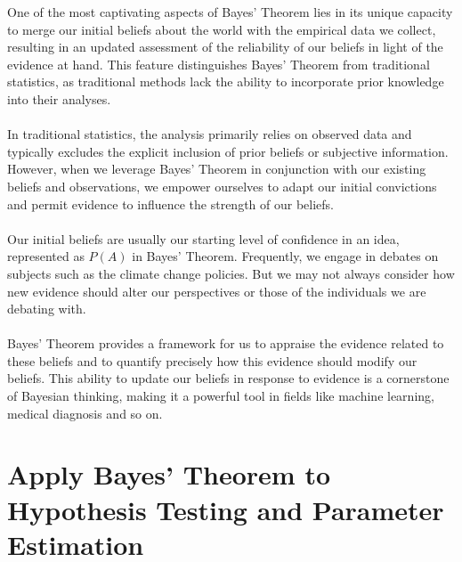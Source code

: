 \documentclass{article}
\begin{document}
One of the most captivating aspects of Bayes' Theorem lies in its unique capacity to merge our initial beliefs about the world with the empirical data we collect, resulting in an updated assessment of the reliability of our beliefs in light of the evidence at hand. This feature distinguishes Bayes' Theorem from traditional statistics, as traditional methods lack the ability to incorporate prior knowledge into their analyses.\\\\
In traditional statistics, the analysis primarily relies on observed data and typically excludes the explicit inclusion of prior beliefs or subjective information. However, when we leverage Bayes' Theorem in conjunction with our existing beliefs and observations, we empower ourselves to adapt our initial convictions and permit evidence to influence the strength of our beliefs.\\\\
Our initial beliefs are usually our starting level of confidence in an idea, represented as \(P(A)\) in Bayes' Theorem. Frequently, we engage in debates on subjects such as the climate change policies. But we may not always consider how new evidence should alter our perspectives or those of the individuals we are debating with.\\\\
Bayes' Theorem provides a framework for us to appraise the evidence related to these beliefs and to quantify precisely how this evidence should modify our beliefs. This ability to update our beliefs in response to evidence is a cornerstone of Bayesian thinking, making it a powerful tool in fields like machine learning, medical diagnosis and so on.
\section{Apply Bayes' Theorem to Hypothesis Testing and Parameter Estimation}
\end{document}
